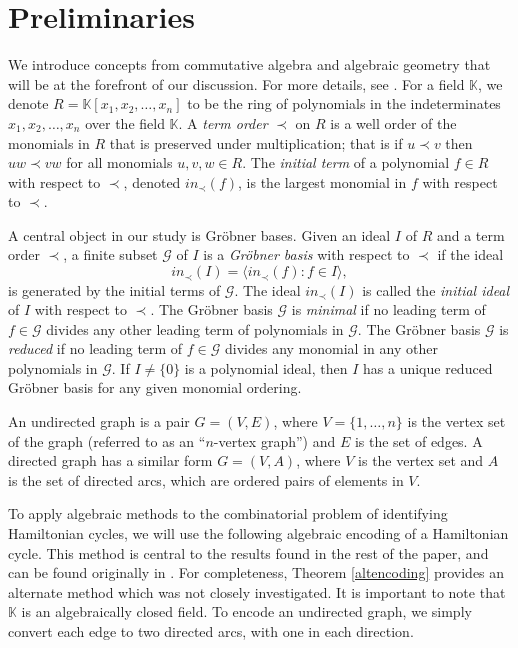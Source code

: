 \documentclass{amsart}
\renewcommand{\(}{\left(}
\renewcommand{\)}{\right)}
\newcommand{\<}{\langle}
\renewcommand{\>}{\rangle}
\renewcommand{\k}{\mathbb K}
\newcommand{\g}{\mathcal{G}}
\newcommand{\ideal}[1]{\langle #1 \rangle}
\theoremstyle{definition}
\theoremstyle{remark}
\begin{document}
\section{Preliminaries} \label{preliminaries}
We introduce concepts from commutative algebra and algebraic geometry that will be at the forefront of our discussion.  For more details, see \cite{coxlittleoshea}.  For a field $\k$, we denote $R=\k[x_1,x_2,\ldots,x_n]$ to be the ring of polynomials in the indeterminates $x_1,x_2,\ldots,x_n$ over the field $\k$.  A \emph{term order} $\prec$ on $R$ is a well order of the monomials in $R$ that is preserved under multiplication; that is if $u \prec v$ then $uw \prec vw$ for all monomials $u,v,w \in R$.  The \emph{initial term} of a polynomial $f \in R$ with respect to $\prec$, denoted $in_{\prec}(f)$, is the largest monomial in $f$ with respect to $\prec$.

A central object in our study is Gr\"{o}bner bases.  Given an ideal $I$ of $R$ and a term order $\prec$, a finite subset $\g$ of $I$ is a \emph{Gr\"{o}bner basis} with respect to $\prec$ if the ideal
\[
in_{\prec}(I) = \ideal{in_{\prec}(f) : f \in I},
\]
is generated by the initial terms of $\g$.  The ideal $in_{\prec}(I)$ is called the \emph{initial ideal} of $I$ with respect to $\prec$.  The Gr\"{o}bner basis $\g$ is \emph{minimal} if no leading term of $f \in \g$ divides any other leading term of polynomials in $\g$. The Gr\"obner basis $\g$ is \emph{reduced} if no leading term of $f \in \g$ divides any monomial in any other polynomials in $\g$. If $I \neq \{0\}$ is a polynomial ideal, then $I$ has a unique reduced Gr\"obner basis for any given monomial ordering.

An undirected graph is a pair $G = (V,E)$, where $V = \{1,\ldots,n\}$ is the vertex set of the graph (referred to as an ``$n$-vertex graph'') and $E$ is the set of edges. A directed graph has a similar form $G = (V,A)$, where $V$ is the vertex set and $A$ is the set of directed arcs, which are ordered pairs of elements in $V$.

To apply algebraic methods to the combinatorial problem of identifying Hamiltonian cycles, we will use the following algebraic encoding of a Hamiltonian cycle. This method is central to the results found in the rest of the paper, and can be found originally in \cite{deloera10}. For completeness, Theorem \ref{altencoding} provides an alternate method which was not closely investigated. It is important to note that $\k$ is an algebraically closed field. To encode an undirected graph, we simply convert each edge to two directed arcs, with one in each direction.
\end{document}
